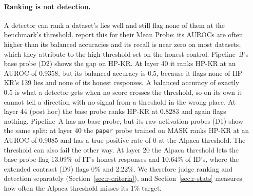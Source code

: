 \paragraph{Ranking is not detection.} A detector can rank a dataset's lies well and still flag none of them at the benchmark's threshold.
\textcite[p.~10]{kretschmar2025liars} report this for their Mean Probe: its AUROCs are often higher than its balanced accuracies and its recall is near zero on most datasets, which they attribute to the high threshold set on the honest control.
Pipeline~B's base probe (D2) shows the gap on HP-KR. %
At layer 40 it ranks HP-KR at an AUROC of 0.9358, but its balanced accuracy is 0.5, because it flags none of HP-KR's 139 lies and none of its honest responses. %
A balanced accuracy of exactly 0.5 is what a detector gets when no score crosses the threshold, so on its own it cannot tell a direction with no signal from a threshold in the wrong place. %
At layer 44 (post hoc) the base probe ranks HP-KR at 0.8283 and again flags nothing. %
Pipeline~A has no base probe, but its raw-activation probes (D1) show the same split: at layer 40 the \texttt{paper} probe trained on MASK ranks HP-KR at an AUROC of 0.9085 and has a true-positive rate of 0 at the Alpaca threshold. %
The threshold can also fail the other way.
At layer 20 the Alpaca threshold lets the base probe flag 13.09\% of IT's honest responses and 10.64\% of ID's, where the extended contrast (D9) flags 0\% and 2.22\%. %
We therefore judge ranking and detection separately (Section~\ref{sec:r-criteria}), and Section~\ref{sec:r-stats} measures how often the Alpaca threshold misses its 1\% target.

